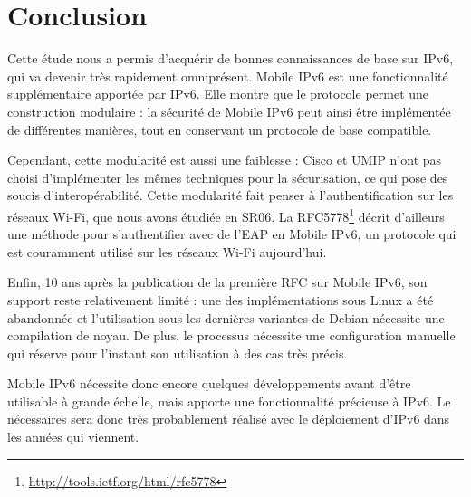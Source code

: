 \section{Conclusion}

Cette étude nous a permis d'acquérir de bonnes connaissances de base sur IPv6, qui va devenir très rapidement omniprésent.
Mobile IPv6 est une fonctionnalité supplémentaire apportée par IPv6.
Elle montre que le protocole permet une construction modulaire : la sécurité de Mobile IPv6 peut ainsi être implémentée de différentes manières, tout en conservant un protocole de base compatible.

Cependant, cette modularité est aussi une faiblesse : Cisco et UMIP n'ont pas choisi d'implémenter les mêmes techniques pour la sécurisation, ce qui pose des soucis d'interopérabilité.
Cette modularité fait penser à l'authentification sur les réseaux Wi-Fi, que nous avons étudiée en SR06.
La RFC5778\footnote{\url{http://tools.ietf.org/html/rfc5778}} décrit d'ailleurs une méthode pour s'authentifier avec de l'EAP en Mobile IPv6, un protocole qui est couramment utilisé sur les réseaux Wi-Fi aujourd'hui.

Enfin, 10 ans après la publication de la première RFC sur Mobile IPv6, son support reste relativement limité : une des implémentations sous Linux a été abandonnée et l'utilisation sous les dernières variantes de Debian nécessite une compilation de noyau.
De plus, le processus nécessite une configuration manuelle qui réserve pour l'instant son utilisation à des cas très précis.

Mobile IPv6 nécessite donc encore quelques développements avant d'être utilisable à grande échelle, mais apporte une fonctionnalité précieuse à IPv6.
Le nécessaires sera donc très probablement réalisé avec le déploiement d'IPv6 dans les années qui viennent.


